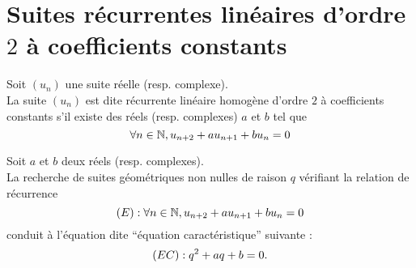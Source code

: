 \section{Suites récurrentes linéaires d’ordre \(2\) à coefficients constants}

\begin{defi}
    Soit \((u_n)\) une suite réelle (resp. complexe).\\
    La suite \((u_n)\) est dite récurrente linéaire homogène d’ordre \(2\) à coefficients constants s’il existe des réels (resp. complexes) \(a\) et \(b\) tel que
    \[\forall n \in \mathbb{N},u_{n+2} +a u_{n+1} + b u_n = 0\]
\end{defi}

\begin{defprop}
    Soit \(a\) et \(b\) deux réels (resp. complexes). \\
    La recherche de suites géométriques non nulles de raison \(q\) vérifiant la relation de récurrence
    \[\left(E\right) : \forall n \in \mathbb{N}, u_{n+2} + a u_{n+1} + bu_n = 0\]
    conduit à l’équation dite “équation caractéristique” suivante :
   \[\left(EC\right) : q^2 + aq + b = 0.\]
\end{defprop}

